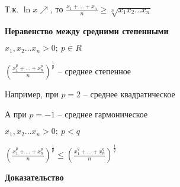 \documentclass[14pt, letter paper]{article}
\begin{document}
Т.к. $\ln{x} \nearrow$, то $\frac{x_1 + \ldots + x_n}{n} \geq \sqrt[n]{x_1x_2\ldots x_n}$

\vspace{5mm}

\textbf{Неравенство между средними степенными}

$x_1, x_2 \ldots x_n > 0;\ p \in R$

$(\frac{x_1^p + \ldots + x_n^p}{n})^\frac{1}{p}$ -- среднее степенное

Например, при $p = 2$ -- среднее квадратическое

А при $p = -1$ -- среднее гармоническое

$x_1, x_2 \ldots x_n > 0;\ p < q$

$(\frac{x_1^p + \ldots + x_n^p}{n})^\frac{1}{p} \leq (\frac{x_1^q + \ldots + x_n^q}{n})^\frac{1}{q}$

\begin{center}
    \textbf{Доказательство}
\end{center}
\end{document}
